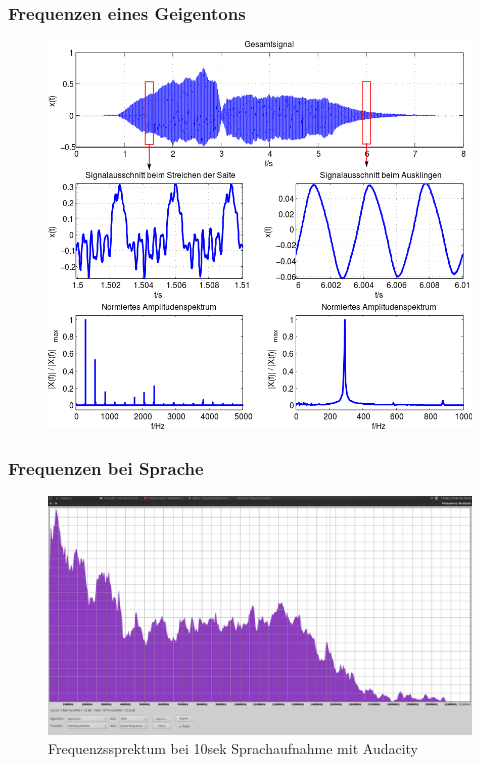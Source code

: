 \begin{frame}
\frametitle{Frequenzen eines Geigentons}
  \begin{center}
    \begin{figure}
      \includegraphics[height=0.75\textheight,width=\textwidth,keepaspectratio]{e14/geigenton.png}
    \end{figure}
\end{center}
\end{frame}

\begin{frame}
\frametitle{Frequenzen bei Sprache}
\begin{center}
\begin{figure}
      \includegraphics[height=0.75\textheight,width=\textwidth,keepaspectratio]{e14/spracheFrequenzen.png}
      \caption{Frequenzssprektum bei 10sek Sprachaufnahme mit Audacity}
    \end{figure}
\end{center}
\end{frame}

